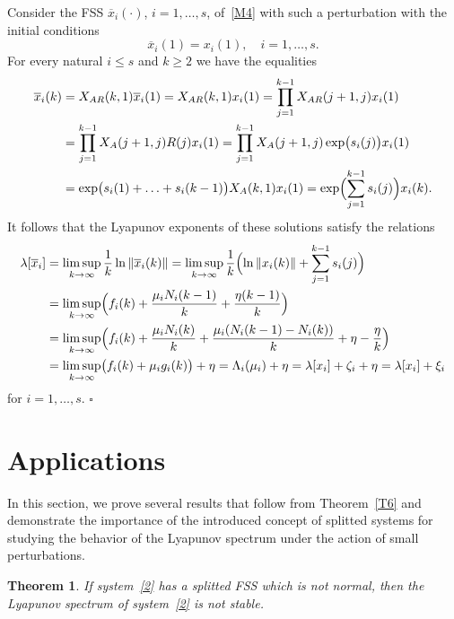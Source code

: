 \documentclass[11pt]{article}
\newtheorem{theorem}{Theorem}[section]
\begin{document}
Consider the FSS $\overline{x}_{i}(\cdot )$, $i=1,\ldots ,s$, of~\eqref{M4}
with such a perturbation with the initial conditions%
\begin{equation*}
\overline{x}_{i}( 1) =x_{i}( 1) ,\quad i=1,\ldots ,s.
\end{equation*}%
For every natural $i\le s$ and $k\ge 2$ we have the equalities
\begin{equation*}
\begin{split}
\overline{x}_{i}(k)&=X_{AR}(k,1)\overline{x}_{i}(1)=X_{AR}(k,1)x_{i}(1)=\prod_{j=1}^{k-1}X_{AR}(j+1,j)x_{i}(1)\\
&=\prod_{j=1}^{k-1}X_{A}(j+1,j)R(j)x_{i}(1)=
\prod_{j=1}^{k-1}X_{A}(j+1,j)\exp\bigl(s_i(j)\bigr)x_{i}(1)\\
&=\exp\bigl(s_i(1)+\ldots+s_{i}(k-1)\bigr)X_A(k,1)x_i(1)=\exp\Bigl(\sum_{j=1}^{k-1}s_i(j)\Bigr)x_i(k).
\end{split}
\end{equation*}
It follows that
the Lyapunov exponents of these solutions satisfy the relations
\begin{equation*}
\begin{split}
\lambda[\overline{x}_{i}] 
&=\limsup_{k\to \infty }\frac{1}{k}\ln\|\overline{x}_{i}(k)\| 
=\limsup_{k\to \infty }\frac{1}{k}\Bigl(\ln\|x_{i}(k)\| +\sum\limits_{j=1}^{k-1}s_{i}(j)\Bigr)\\
&=\limsup_{k\to\infty}\Bigl(f_{i}(k)+\frac{\mu_{i}N_{i}(k-1)}{k}+\frac{\eta(k-1)}{k}\Bigr)\\ 
&=\limsup_{k\to \infty }\Bigl(f_{i}(k)+\frac{\mu_{i}N_{i}(k)}{k}+\frac{\mu_i(N_i(k-1)-N_i(k))}{k}+\eta-\frac{\eta}{k}\Bigr)\\
&=\limsup_{k\to \infty }\bigl(f_{i}(k)+\mu_{i}g_{i}(k)\bigr) +\eta= 
\Lambda _{i}( \mu _{i}) +\eta =\lambda [ x_{i}] +\zeta_{i}+\eta
=\lambda [ x_{i}] +\xi_{i}
\end{split}
\end{equation*}%
for $i=1,\dots ,s$. 
\hfill $\square$




\section{Applications} \label{sect6}
In this section, we prove several results that follow from Theorem~\ref{T6} and demonstrate the importance of the introduced 
concept of splitted systems for studying the behavior of the Lyapunov spectrum  under the action of 
small perturbations. 

\begin{theorem}
\label{T7}
\it
If system~\eqref{2} has a splitted FSS which is not normal, then
the Lyapunov spectrum of system~\eqref{2} is not stable.
\end{theorem}
\end{document}
